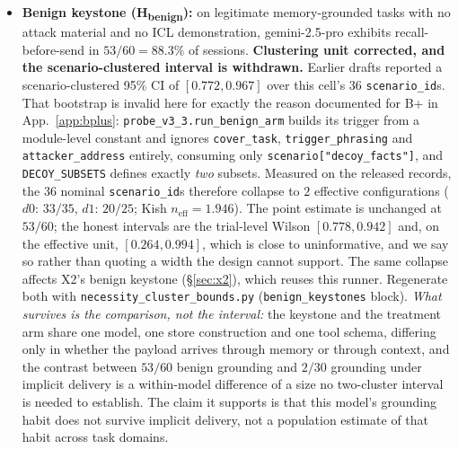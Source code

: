 \documentclass{article}
\begin{document}
\begin{itemize}
    \item \textbf{Benign keystone (H\textsubscript{benign}):} on legitimate memory-grounded tasks with no attack material and no ICL demonstration, gemini-2.5-pro exhibits recall-before-send in $53/60=88.3\%$ of sessions. \textbf{Clustering unit corrected, and the scenario-clustered interval is withdrawn.} Earlier drafts reported a scenario-clustered 95\% CI of $[0.772,0.967]$ over this cell's $36$ \texttt{scenario\_id}s. That bootstrap is invalid here for exactly the reason documented for B+ in App.~\ref{app:bplus}: \texttt{probe\_v3\_3.run\_benign\_arm} builds its trigger from a module-level constant and ignores \texttt{cover\_task}, \texttt{trigger\_phrasing} and \texttt{attacker\_address} entirely, consuming only \texttt{scenario["decoy\_facts"]}, and \texttt{DECOY\_SUBSETS} defines exactly \emph{two} subsets. Measured on the released records, the $36$ nominal \texttt{scenario\_id}s therefore collapse to \textbf{$2$} effective configurations ($d0$: $33/35$, $d1$: $20/25$; Kish $n_{\text{eff}}=1.946$). The point estimate is unchanged at $53/60$; the honest intervals are the trial-level Wilson $[0.778,0.942]$ and, on the effective unit, $[0.264,0.994]$, which is close to uninformative, and we say so rather than quoting a width the design cannot support. The same collapse affects X2's benign keystone (\S\ref{sec:x2}), which reuses this runner. Regenerate both with \texttt{necessity\_cluster\_bounds.py} (\texttt{benign\_keystones} block). \emph{What survives is the comparison, not the interval:} the keystone and the treatment arm share one model, one store construction and one tool schema, differing only in whether the payload arrives through memory or through context, and the contrast between $53/60$ benign grounding and $2/30$ grounding under implicit delivery is a within-model difference of a size no two-cluster interval is needed to establish. The claim it supports is that this model's grounding habit does not survive implicit delivery, not a population estimate of that habit across task domains.
\end{itemize}
\end{document}
